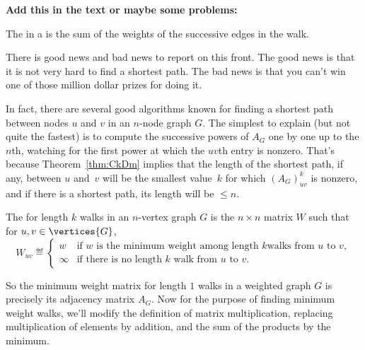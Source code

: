 \begin{editingnotes}
\textbf{Add this in the text or maybe some problems:}

\begin{definition}\label{def:5H}
  The   in a  is the sum of the weights of
  the successive edges in the walk.
\end{definition}

There is good news and bad news to report on this front.  The good
news is that it is not very hard to find a shortest path.  The bad
news is that you can't win one of those million dollar prizes for
doing it.

In fact, there are several good algorithms known for finding a shortest
path between nodes $u$ and $v$ in an $n$-node graph $G$.  The simplest to
explain (but not quite the fastest) is to compute  the successive powers of $A_G$ one by one up
to the $n$th, watching for the first power at which the $uv$th entry is
nonzero.  That's because Theorem~\ref{thm:CkDm} implies that the length of
the shortest path, if any, between $u$ and~$v$ will be the smallest
value~$k$ for which $(A_G)_{uv}^k$ is nonzero, and if there is a shortest
path, its length will be $\leq n$.

\begin{definition}
  The  for length $k$ walks in an $n$-vertex
  graph $G$ is the $n \times n$ matrix $W$ such that for $u,v \in \vertices{G}$,
\begin{equation}\label{def:weight_matrix}
W_{uv} \eqdef
\begin{cases} w & \text{if $w$ is the minimum weight among length $k$
                            walks from $u$ to $v$},\\
              \infty & \text{if there is no length $k$ walk from $u$ to $v$}.
\end{cases}
\end{equation}
\end{definition}

So the minimum weight matrix for length $1$ walks in a weighted graph $G$
is precisely its adjacency matrix $A_G$.  Now for the purpose of finding
minimum weight walks, we'll modify the definition of matrix
multiplication, replacing multiplication of elements by addition, and the
sum of the products by the minimum.



\end{editingnotes}
